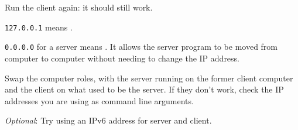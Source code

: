 Run the client again: it should still work.

\begin{IMPORTANT}
\texttt{127.0.0.1} means .

\texttt{0.0.0.0} for a server means . It allows
the server program to be moved from computer to computer without needing to change the
IP address.
\end{IMPORTANT}

\STEP Swap the computer roles, with the server running on the former client computer and
the client on what used to be the server. If they don't work, check the IP addresses
you are using as command line arguments.




\emph{Optional}: Try using an IPv6 address for server and client.


\COPYRIGHT


